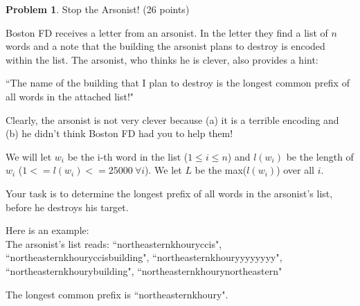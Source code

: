 \documentclass[11pt]{article}
\theoremstyle{definition}
\theoremstyle{theorem}
\newtheorem{prob}{Problem}
\begin{document}
\newpage

\begin{prob} Stop the Arsonist! (26 points) \end{prob}

Boston FD receives a letter from an arsonist. In the letter they find a list of $n$ words and a note that the building the arsonist plans to destroy is encoded within the list. The arsonist, who thinks he is clever, also provides a hint:

``The name of the building that I plan to destroy is the longest common prefix of all words in the attached list!"

Clearly, the arsonist is not very clever because (a) it is a terrible encoding and (b) he didn't think Boston FD had you to help them!

We will let $w_i$ be the i-th word in the list ($1 \leq i \leq n$) and $l(w_i)$ be the length of $w_i$ ($1 <= l(w_i) <= 25000~ \forall i$). We let $L$ be the max($l(w_i)$) over all $i$.

Your task is to determine the longest prefix of all words in the arsonist's list, before he destroys his target.


Here is an example:\\

The arsonist's list reads: ``northeasternkhouryccis", ``northeasternkhouryccisbuilding", ``northeasternkhouryyyyyyyy", ``northeasternkhourybuilding", ``northeasternkhourynortheastern"

\vspace{0.2cm}

The longest common prefix is ``northeasternkhoury".\\
\end{document}
